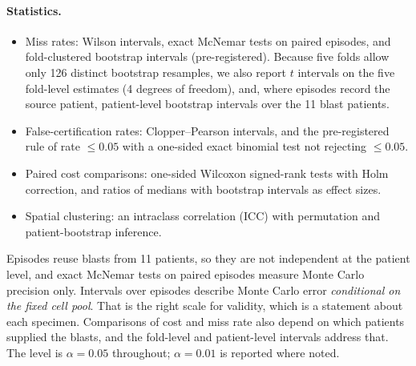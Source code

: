 \documentclass[11pt]{article}
\theoremstyle{remark}
\theoremstyle{definition}
\begin{document}
\paragraph{Statistics.}
\begin{itemize}
\item Miss rates: Wilson intervals, exact McNemar tests on paired episodes, and fold-clustered bootstrap intervals (pre-registered). Because five folds allow only 126 distinct bootstrap resamples, we also report $t$ intervals on the five fold-level estimates (4 degrees of freedom), and, where episodes record the source patient, patient-level bootstrap intervals over the 11 blast patients.
\item False-certification rates: Clopper--Pearson intervals, and the pre-registered rule of rate $\le 0.05$ with a one-sided exact binomial test not rejecting $\le0.05$.
\item Paired cost comparisons: one-sided Wilcoxon signed-rank tests with Holm correction, and ratios of medians with bootstrap intervals as effect sizes.
\item Spatial clustering: an intraclass correlation (ICC) with permutation and patient-bootstrap inference.
\end{itemize}
Episodes reuse blasts from 11 patients, so they are not independent at the patient level, and exact McNemar tests on paired episodes measure Monte Carlo precision only. Intervals over episodes describe Monte Carlo error \emph{conditional on the fixed cell pool}. That is the right scale for validity, which is a statement about each specimen. Comparisons of cost and miss rate also depend on which patients supplied the blasts, and the fold-level and patient-level intervals address that. The level is $\alpha=0.05$ throughout; $\alpha=0.01$ is reported where noted.
\end{document}
